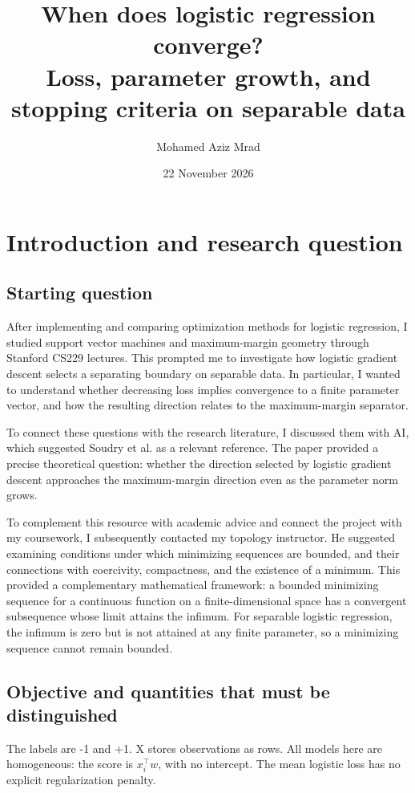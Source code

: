 \documentclass[12pt,a4paper]{article}
\title{When does logistic regression converge?\\[0.4em]\large Loss, parameter growth, and stopping criteria on separable data}
\author{Mohamed Aziz Mrad}
\date{22 November 2026}
\begin{document}
\maketitle
\section{Introduction and research question}
\subsection{Starting question}
After implementing and comparing optimization methods for logistic regression, I studied support vector machines and maximum-margin geometry through Stanford CS229 lectures. This prompted me to investigate how logistic gradient descent selects a separating boundary on separable data. In particular, I wanted to understand whether decreasing loss implies convergence to a finite parameter vector, and how the resulting direction relates to the maximum-margin separator.

To connect these questions with the research literature, I discussed them with AI, which suggested Soudry et al. as a relevant reference. The paper provided a precise theoretical question: whether the direction selected by logistic gradient descent approaches the maximum-margin direction even as the parameter norm grows.

To complement this resource with academic advice and connect the project with my coursework, I subsequently contacted my topology instructor. He suggested examining conditions under which minimizing sequences are bounded, and their connections with coercivity, compactness, and the existence of a minimum. This provided a complementary mathematical framework: a bounded minimizing sequence for a continuous function on a finite-dimensional space has a convergent subsequence whose limit attains the infimum. For separable logistic regression, the infimum is zero but is not attained at any finite parameter, so a minimizing sequence cannot remain bounded.

\subsection{Objective and quantities that must be distinguished}
The labels are -1 and +1. X stores observations as rows. All models here are homogeneous: the score is $x_i^\top w$, with no intercept. The mean logistic loss has no explicit regularization penalty.
\end{document}

